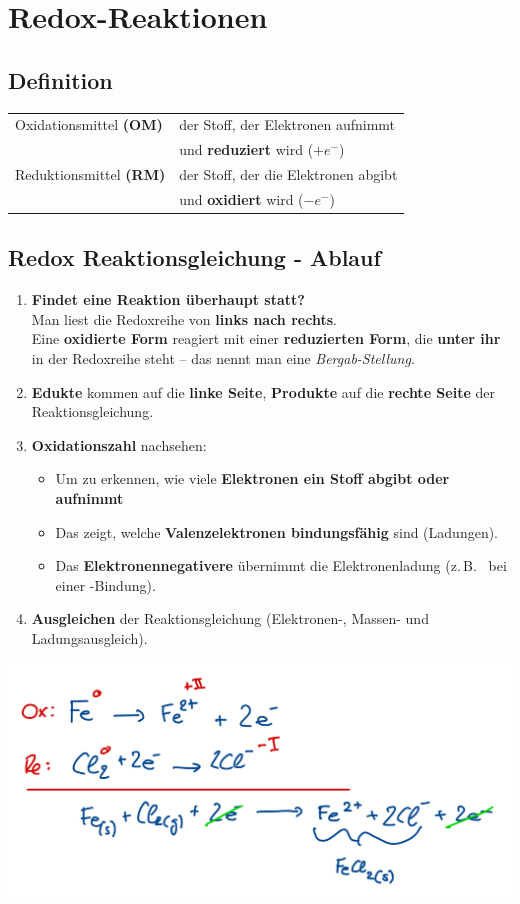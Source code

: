 \section{Redox-Reaktionen}

\subsection{Definition}
\begin{tabular}{l l}
	Oxidationsmittel \textbf{(OM)} & der Stoff, der Elektronen aufnimmt                  \\
	                               & und \textbf{reduziert} wird ($+e^-$)                       \\
	Reduktionsmittel \textbf{(RM)} & der Stoff, der die Elektronen abgibt                \\
	                               & und \textbf{oxidiert} wird ($-e^-$)                        \\
\end{tabular}

\subsection{Redox Reaktionsgleichung - Ablauf}

\begin{enumerate}
	\item \textbf{Findet eine Reaktion überhaupt statt?} \\
	Man liest die Redoxreihe von \textbf{links nach rechts}. \\
	Eine \textbf{oxidierte Form} reagiert mit einer \textbf{reduzierten Form}, die \textbf{unter ihr} in der Redoxreihe steht – das nennt man eine \textit{Bergab-Stellung}.
	
	\item \textbf{Edukte} kommen auf die \textbf{linke Seite}, \textbf{Produkte} auf die \textbf{rechte Seite} der Reaktionsgleichung.
	
	\item \textbf{Oxidationszahl} nachsehen:
	\begin{itemize}
		\item Um zu erkennen, wie viele \textbf{Elektronen ein Stoff abgibt oder aufnimmt}
		\item Das zeigt, welche \textbf{Valenzelektronen bindungsfähig} sind (Ladungen).
		\item Das \textbf{Elektronennegativere} übernimmt die Elektronenladung (z.\,B.\  bei einer -Bindung).
	\end{itemize}
	
	\item \textbf{Ausgleichen} der Reaktionsgleichung (Elektronen-, Massen- und Ladungsausgleich).
\end{enumerate}

\begin{flushleft}
	\includegraphics[width=0.5\linewidth]{images/redoxreaktion.png}
\end{flushleft}